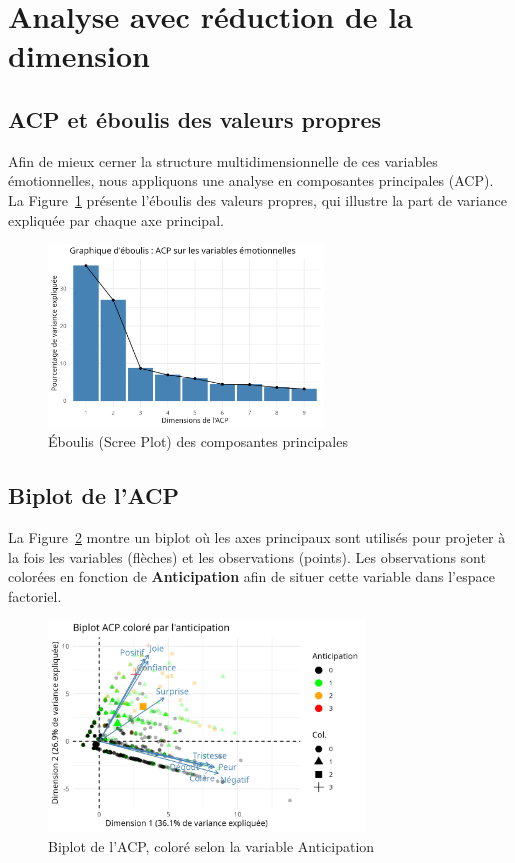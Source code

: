 \documentclass[12pt,a4paper]{article}
\begin{document}
	\section{Analyse avec réduction de la dimension}
	
	\subsection{ACP et éboulis des valeurs propres}
	Afin de mieux cerner la structure multidimensionnelle de ces variables
	émotionnelles, nous appliquons une analyse en composantes principales (ACP).
	La Figure~\ref{fig:pca_scree} présente l’éboulis des valeurs propres, qui illustre
	la part de variance expliquée par chaque axe principal.
	
	\begin{figure}[H]
		\centering
		\includegraphics[width=0.65\textwidth]{figures_PCA/pca_screeplot.png}
		\caption{Éboulis (Scree Plot) des composantes principales}
		\label{fig:pca_scree}
	\end{figure}
	
	\subsection{Biplot de l’ACP}
	La Figure~\ref{fig:pca_biplot} montre un biplot où les axes principaux sont
	utilisés pour projeter à la fois les variables (flèches) et les observations
	(points). Les observations sont colorées en fonction de \textbf{Anticipation} afin
	de situer cette variable dans l’espace factoriel.
	
	\begin{figure}[H]
		\centering
		\includegraphics[width=0.75\textwidth]{figures_PCA/pca_biplot_anticipation.png}
		\caption{Biplot de l’ACP, coloré selon la variable Anticipation}
		\label{fig:pca_biplot}
	\end{figure}
	
\end{document}
